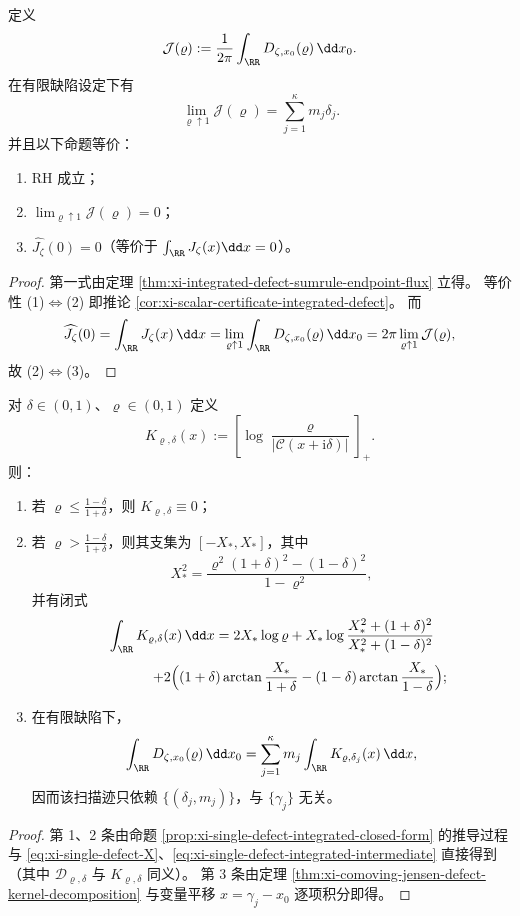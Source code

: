 \begin{theorem}\label{thm:xi-finite-defect-rh-scan-trace-equivalence}
定义
\[
\mathcal J(\varrho):=\frac{1}{2\pi}\int_{\RR}D_{\zeta,x_0}(\varrho)\,\dd x_0.
\]
在有限缺陷设定下有
\[
\lim_{\varrho\uparrow 1}\mathcal J(\varrho)
=\sum_{j=1}^{\kappa}m_j\delta_j.
\]
并且以下命题等价：
\begin{enumerate}
  \item RH 成立；
  \item \(\displaystyle \lim_{\varrho\uparrow 1}\mathcal J(\varrho)=0\)；
  \item \(\widehat{J_\zeta}(0)=0\)（等价于 \(\int_{\RR}J_\zeta(x)\dd x=0\)）。
\end{enumerate}
\end{theorem}
\begin{proof}
第一式由定理 \ref{thm:xi-integrated-defect-sumrule-endpoint-flux} 立得。
等价性 (1)\(\Leftrightarrow\)(2) 即推论 \ref{cor:xi-scalar-certificate-integrated-defect}。
而
\[
\widehat{J_\zeta}(0)=\int_{\RR}J_\zeta(x)\,\dd x
=\lim_{\varrho\uparrow 1}\int_{\RR}D_{\zeta,x_0}(\varrho)\,\dd x_0
=2\pi\lim_{\varrho\uparrow 1}\mathcal J(\varrho),
\]
故 (2)\(\Leftrightarrow\)(3)。
\end{proof}

\begin{proposition}[有限半径扫描迹闭式与高度变量消去]\label{prop:xi-finite-rho-scan-trace-closed-form}
对 \(\delta\in(0,1)\)、\(\varrho\in(0,1)\) 定义
\[
K_{\varrho,\delta}(x):=\left[\log\frac{\varrho}{|\mathcal C(x+\mathrm{i}\delta)|}\right]_+.
\]
则：
\begin{enumerate}
  \item 若 \(\varrho\le\frac{1-\delta}{1+\delta}\)，则 \(K_{\varrho,\delta}\equiv 0\)；
  \item 若 \(\varrho>\frac{1-\delta}{1+\delta}\)，则其支集为 \([-X_*,X_*]\)，其中
  \[
  X_*^2=\frac{\varrho^2(1+\delta)^2-(1-\delta)^2}{1-\varrho^2},
  \]
  并有闭式
  \[
  \int_{\RR}K_{\varrho,\delta}(x)\,\dd x
  =2X_*\log\varrho
  +X_*\log\frac{X_*^2+(1+\delta)^2}{X_*^2+(1-\delta)^2}
  \]
  \[
  \qquad\qquad
  +2\Bigl((1+\delta)\arctan\frac{X_*}{1+\delta}
  -(1-\delta)\arctan\frac{X_*}{1-\delta}\Bigr);
  \]
  \item 在有限缺陷下，
  \[
  \int_{\RR}D_{\zeta,x_0}(\varrho)\,\dd x_0
  =\sum_{j=1}^{\kappa}m_j\int_{\RR}K_{\varrho,\delta_j}(x)\,\dd x,
  \]
  因而该扫描迹只依赖 \(\{(\delta_j,m_j)\}\)，与 \(\{\gamma_j\}\) 无关。
\end{enumerate}
\end{proposition}
\begin{proof}
第 1、2 条由命题 \ref{prop:xi-single-defect-integrated-closed-form} 的推导过程与
\eqref{eq:xi-single-defect-X}、\eqref{eq:xi-single-defect-integrated-intermediate} 直接得到（其中 \(\mathcal D_{\varrho,\delta}\) 与 \(K_{\varrho,\delta}\) 同义）。
第 3 条由定理 \ref{thm:xi-comoving-jensen-defect-kernel-decomposition} 与变量平移 \(x=\gamma_j-x_0\) 逐项积分即得。
\end{proof}

\endinput

